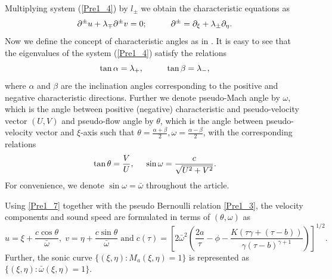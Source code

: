 \documentclass[3p,11pt]{elsarticle}
\numberwithin{equation}{section}
\begin{document}
Multiplying system (\ref{Pre1_4}) by $l_{\pm}$ we obtain the characteristic equations as
\begin{equation}\label{Pre1_5}
    \partial^\pm u+\lambda_\mp\partial^\pm v=0; \hspace{10mm}\partial^\pm=\partial_\xi+\lambda_{\pm} \partial_\eta.
\end{equation}
Now we define the concept of characteristic angles as in \cite{chdecomposition}. It is easy to see that the eigenvalues of the system (\ref{Pre1_4}) satisfy the relations
\begin{equation*}\label{Pre1_6}
    \tan \alpha=\lambda_+, \hspace{10mm} \tan \beta=\lambda_-,
\end{equation*}
where $\alpha$ and $\beta$ are the inclination angles corresponding to the positive and negative characteristic directions. Further we denote pseudo-Mach angle by $\omega$, which is the angle between positive (negative) characteristic and pseudo-velocity vector $(U, V)$ and pseudo-flow angle by $\theta$, which is the angle between pseudo-velocity vector and $\xi$-axis such that $\theta=\frac{\alpha+\beta}{2}, \omega=\frac{\alpha-\beta}{2}$, with the corresponding relations
\begin{equation}\label{Pre1_7}
    \tan \theta =\frac{V}{U}, \hspace{5mm} \sin \omega = \frac{c}{\sqrt{U^2+V^2}}.
\end{equation}
For convenience, we denote $\sin\omega=\bar\omega$ throughout the article.

Using \eqref{Pre1_7} together with the pseudo Bernoulli relation \eqref{Pre1_3}, the velocity components and sound speed are formulated in terms of $(\theta,\omega)$ as \cite{MR3342411}
\begin{equation}\label{Pre1_8}
    u=\xi+\frac{c \cos \theta}{\bar\omega}, \; v=\eta+\frac{c \sin \theta}{\bar\omega} \; \text{and}\; c(\tau) = \left[2\bar\omega^2\left(\frac{2a}{\tau}-\phi-\frac{K(\tau\gamma+(\tau-b))}{\gamma(\tau-b)^{\gamma+1}} \right) \right]^{1/2}.
\end{equation}
Further, the sonic curve $\{(\xi,\eta): M_a(\xi,\eta)=1\}$ is represented as $\{(\xi,\eta): \bar\omega(\xi,\eta)=1\}$. 
\end{document}
